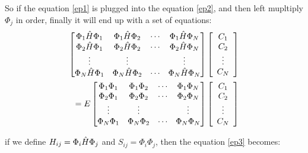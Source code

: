 \documentclass[a4paper, 12pt, titlepage,oneside,drop]{kthesis}
\begin{document}
\noindent So if the equation \ref{ep1} is plugged into the equation \ref{ep2}, and then left mupltiply $\Phi_j$ in order, finally it will end up with a set of equations:
\begin{equation}\begin{split}\label{ep3}
\left[
\begin{matrix}
    \Phi_1 \hat{H} \Phi_1 & \Phi_1 \hat{H} \Phi_2 & \cdots & \Phi_1 \hat{H} \Phi_N \\
    \Phi_2 \hat{H} \Phi_1 & \Phi_2 \hat{H} \Phi_2 & \cdots & \Phi_2 \hat{H} \Phi_N \\
    \vdots               & \vdots               &        & \vdots               \\
    \Phi_N \hat{H} \Phi_1 & \Phi_N \hat{H} \Phi_2 & \cdots & \Phi_N \hat{H} \Phi_N \\
\end{matrix} \right] \left[ \begin{array}{c} C_1 \\ C_2 \\ \vdots \\ C_N\end{array} \right] \\
=E \left[
\begin{matrix}
    \Phi_1 \Phi_1 & \Phi_1 \Phi_2 & \cdots & \Phi_1 \Phi_N \\
   \Phi_2 \Phi_1 & \Phi_2 \Phi_2 & \cdots & \Phi_2 \Phi_N \\
    \vdots               & \vdots               &        & \vdots               \\
   \Phi_N \Phi_1 & \Phi_N \Phi_2 & \cdots & \Phi_N \Phi_N \\
\end{matrix} \right]\left[ \begin{array}{c} C_1 \\ C_2 \\ \vdots \\ C_N\end{array} \right]
\end{split}\end{equation}

\noindent if we define $H_{ij} = \Phi_i \hat{H} \Phi_j$ and $S_{ij} = \Phi_i \Phi_j$, then the equation \ref{ep3} becomes:
\end{document}
